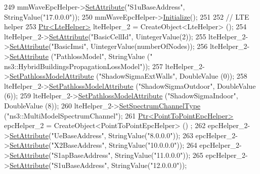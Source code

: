 \begin{DoxyCode}
{{{249   mmWaveEpcHelper->\hyperlink{classns3_1_1ObjectBase_ac60245d3ea4123bbc9b1d391f1f6592f}{SetAttribute}(\textcolor{stringliteral}{"S1uBaseAddress"}, StringValue(\textcolor{stringliteral}{"17.0.0.0"}));
250   mmWaveEpcHelper->\hyperlink{classns3_1_1Object_af4411cb29971772fcd09203474a95078}{Initialize}();
251 
252   \textcolor{comment}{// LTE helper}
253   \hyperlink{classns3_1_1Ptr}{Ptr<LteHelper>} lteHelper\_2 = CreateObject<LteHelper> ();
254   lteHelper\_2->\hyperlink{classns3_1_1ObjectBase_ac60245d3ea4123bbc9b1d391f1f6592f}{SetAttribute}(\textcolor{stringliteral}{"BasicCellId"}, UintegerValue(2));
255   lteHelper\_2->\hyperlink{classns3_1_1ObjectBase_ac60245d3ea4123bbc9b1d391f1f6592f}{SetAttribute}(\textcolor{stringliteral}{"BasicImsi"}, UintegerValue(numberOfNodes));
256   lteHelper\_2->\hyperlink{classns3_1_1ObjectBase_ac60245d3ea4123bbc9b1d391f1f6592f}{SetAttribute} (\textcolor{stringliteral}{"PathlossModel"}, StringValue (\textcolor{stringliteral}{"
      ns3::HybridBuildingsPropagationLossModel"}));
257   lteHelper\_2->\hyperlink{classns3_1_1LteHelper_aa96ebbd6845ca61c2b5e08e84481a348}{SetPathlossModelAttribute} (\textcolor{stringliteral}{"ShadowSigmaExtWalls"}, DoubleValue (0));
258   lteHelper\_2->\hyperlink{classns3_1_1LteHelper_aa96ebbd6845ca61c2b5e08e84481a348}{SetPathlossModelAttribute} (\textcolor{stringliteral}{"ShadowSigmaOutdoor"}, DoubleValue (6));
259   lteHelper\_2->\hyperlink{classns3_1_1LteHelper_aa96ebbd6845ca61c2b5e08e84481a348}{SetPathlossModelAttribute} (\textcolor{stringliteral}{"ShadowSigmaIndoor"}, DoubleValue (8));
260   lteHelper\_2->\hyperlink{classns3_1_1LteHelper_a8629b4cbc04f51c51c3b2431a42b0763}{SetSpectrumChannelType} (\textcolor{stringliteral}{"ns3::MultiModelSpectrumChannel"});
261   \hyperlink{classns3_1_1Ptr}{Ptr<PointToPointEpcHelper>} epcHelper\_2 = CreateObject<PointToPointEpcHelper> ()
      ;
262   epcHelper\_2->\hyperlink{classns3_1_1ObjectBase_ac60245d3ea4123bbc9b1d391f1f6592f}{SetAttribute}(\textcolor{stringliteral}{"UeBaseAddress"}, StringValue(\textcolor{stringliteral}{"8.0.0.0"}));
263   epcHelper\_2->\hyperlink{classns3_1_1ObjectBase_ac60245d3ea4123bbc9b1d391f1f6592f}{SetAttribute}(\textcolor{stringliteral}{"X2BaseAddress"}, StringValue(\textcolor{stringliteral}{"10.0.0.0"}));
264   epcHelper\_2->\hyperlink{classns3_1_1ObjectBase_ac60245d3ea4123bbc9b1d391f1f6592f}{SetAttribute}(\textcolor{stringliteral}{"S1apBaseAddress"}, StringValue(\textcolor{stringliteral}{"11.0.0.0"}));
265   epcHelper\_2->\hyperlink{classns3_1_1ObjectBase_ac60245d3ea4123bbc9b1d391f1f6592f}{SetAttribute}(\textcolor{stringliteral}{"S1uBaseAddress"}, StringValue(\textcolor{stringliteral}{"12.0.0.0"}));
}}}
\end{DoxyCode}
